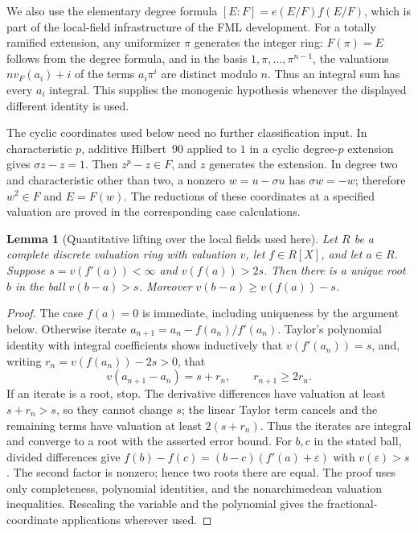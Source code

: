 \documentclass[11pt]{amsart}
\newtheorem{lemma}[theorem]{Lemma}
\theoremstyle{definition}
\theoremstyle{remark}
\begin{document}
We also use the elementary degree formula $[E:F]=e(E/F)f(E/F)$,
which is part of the local-field infrastructure of the FML development.
For a totally ramified extension, any uniformizer $\pi$ generates the
integer ring: $F(\pi)=E$ follows from the degree formula, and in the
basis $1,\pi,\ldots,\pi^{n-1}$, the valuations
$n v_F(a_i)+i$ of the terms $a_i\pi^i$ are distinct modulo $n$.
Thus an integral sum has every $a_i$ integral. This supplies the
monogenic hypothesis whenever the displayed different identity is used.

The cyclic coordinates used below need no further classification
input. In characteristic $p$, additive Hilbert~90 applied to $1$ in a
cyclic degree-$p$ extension gives $\sigma z-z=1$. Then $z^p-z\in F$,
and $z$ generates the extension. In degree two and characteristic
other than two, a nonzero $w=u-\sigma u$ has $\sigma w=-w$;
therefore $w^2\in F$ and $E=F(w)$. The reductions of these coordinates
at a specified valuation are proved in the corresponding case calculations.

\begin{lemma}[Quantitative lifting over the local fields used here]
\label{D:newton}
Let $R$ be a complete discrete valuation ring with valuation $v$, let
$f\in R[X]$, and let $a\in R$. Suppose $s=v(f'(a))<\infty$ and
$v(f(a))>2s$. Then there is a unique root $b$ in the ball
$v(b-a)>s$. Moreover $v(b-a)\ge v(f(a))-s$.
\end{lemma}
\begin{proof}
The case $f(a)=0$ is immediate, including uniqueness by the argument
below. Otherwise iterate $a_{n+1}=a_n-f(a_n)/f'(a_n)$.
Taylor's polynomial identity with integral coefficients shows
inductively that $v(f'(a_n))=s$, and, writing
$r_n=v(f(a_n))-2s>0$, that
\[
 v(a_{n+1}-a_n)=s+r_n,\qquad r_{n+1}\ge2r_n.
\]
If an iterate is a root, stop. The derivative differences have valuation
at least $s+r_n>s$, so they cannot change $s$; the linear Taylor term
cancels and the remaining terms have valuation at least $2(s+r_n)$.
Thus the iterates are integral and converge to a root with the asserted
error bound. For $b,c$ in the stated ball, divided differences give
$f(b)-f(c)=(b-c)(f'(a)+\varepsilon)$ with $v(\varepsilon)>s$.
The second factor is nonzero; hence two roots there are equal.
The proof uses only completeness, polynomial identities, and the
nonarchimedean valuation inequalities. Rescaling the variable and the
polynomial gives the fractional-coordinate applications wherever used.
\end{proof}
\end{document}
